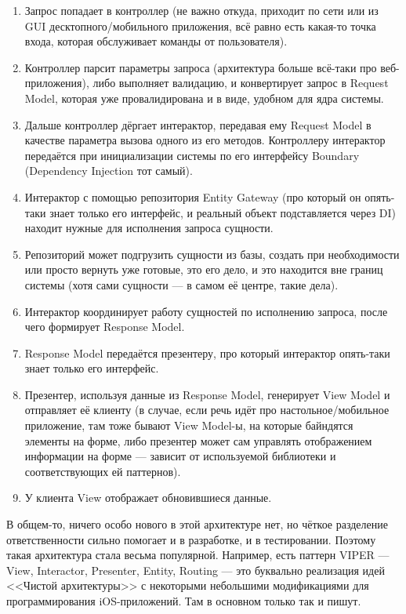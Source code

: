 \documentclass{../../text-style}
\begin{document}
\begin{enumerate}
    \item Запрос попадает в контроллер (не важно откуда, приходит по сети или из GUI десктопного/мобильного приложения, всё равно есть какая-то точка входа, которая обслуживает команды от пользователя).
    \item Контроллер парсит параметры запроса (архитектура больше всё-таки про веб-приложения), либо выполняет валидацию, и конвертирует запрос в Request Model, которая уже провалидирована и в виде, удобном для ядра системы.
    \item Дальше контроллер дёргает интерактор, передавая ему Request Model в качестве параметра вызова одного из его методов. Контроллеру интерактор передаётся при инициализации системы по его интерфейсу Boundary (Dependency Injection тот самый).
    \item Интерактор с помощью репозитория Entity Gateway (про который он опять-таки знает только его интерфейс, и реальный объект подставляется через DI) находит нужные для исполнения запроса сущности.
    \item Репозиторий может подгрузить сущности из базы, создать при необходимости или просто вернуть уже готовые, это его дело, и это находится вне границ системы (хотя сами сущности --- в самом её центре, такие дела).
    \item Интерактор координирует работу сущностей по исполнению запроса, после чего формирует Response Model.
    \item Response Model передаётся презентеру, про который интерактор опять-таки знает только его интерфейс.
    \item Презентер, используя данные из Response Model, генерирует View Model и отправляет её клиенту (в случае, если речь идёт про настольное/мобильное приложение, там тоже бывают View Model-ы, на которые байндятся элементы на форме, либо презентер может сам управлять отображением информации на форме --- зависит от используемой библиотеки и соответствующих ей паттернов).
    \item У клиента View отображает обновившиеся данные.
\end{enumerate}

В общем-то, ничего особо нового в этой архитектуре нет, но чёткое разделение ответственности сильно помогает и в разработке, и в тестировании. Поэтому такая архитектура стала весьма популярной. Например, есть паттерн VIPER --- View, Interactor, Presenter, Entity, Routing --- это буквально реализация идей <<Чистой архитектуры>> с некоторыми небольшими модификациями для программирования iOS-приложений. Там в основном только так и пишут.
\end{document}
